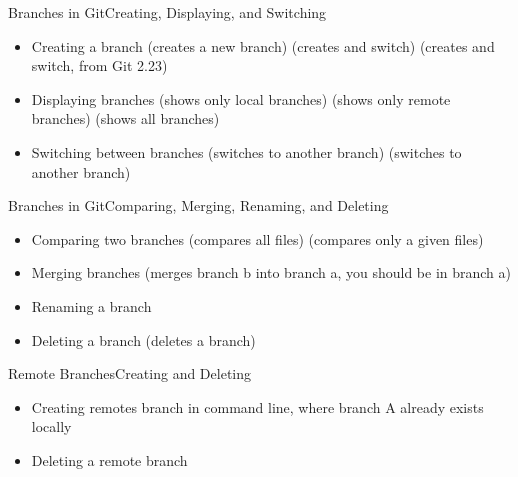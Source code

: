  \begin{frame}{Branches in Git}{Creating, Displaying, and Switching}
  \begin{itemize}
\item Creating a branch
   (creates a new branch)
   (creates and switch)
   (creates and switch, from Git 2.23)
\item Displaying branches
   (shows only local branches)
   (shows only remote branches)
   (shows all branches)
\item Switching between branches
   (switches to another branch)
   (switches to another branch)
\end{itemize}
\end{frame}

 \begin{frame}{Branches in Git}{Comparing, Merging, Renaming, and Deleting}
  \begin{itemize}
\item Comparing two branches
   (compares all files)
   (compares only a given files)
\item Merging branches
   (merges branch b into branch a, you should be in branch a)
\item Renaming a branch
\item Deleting a branch 
   (deletes a branch)
\end{itemize}
\end{frame}

\begin{frame}{Remote Branches}{Creating and Deleting}
  \begin{itemize}
\item Creating remotes branch in command line, where branch A already exists locally
\item Deleting a remote branch 
\end{itemize}
\end{frame}
